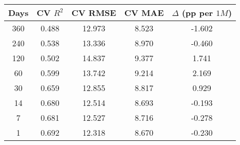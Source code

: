 \begin{tabular}{||c c c c c||}
\hline
Days & CV $R^2$ & CV RMSE & CV MAE & $\Delta$ (pp per $1M$) \\
\hline\hline
360 & 0.488 & 12.973 & 8.523 & -1.602 \\
240 & 0.538 & 13.336 & 8.970 & -0.460 \\
120 & 0.502 & 14.837 & 9.377 & 1.741 \\
60 & 0.599 & 13.742 & 9.214 & 2.169 \\
30 & 0.659 & 12.855 & 8.817 & 0.929 \\
14 & 0.680 & 12.514 & 8.693 & -0.193 \\
7 & 0.681 & 12.527 & 8.716 & -0.278 \\
1 & 0.692 & 12.318 & 8.670 & -0.230 \\
\hline
\end{tabular}
